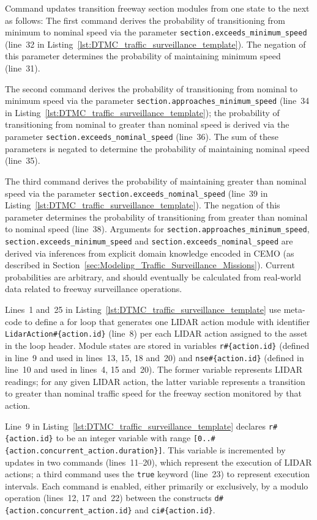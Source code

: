 Command updates transition freeway section modules from one state to the next as follows: The first command derives the probability of transitioning from minimum to nominal speed via the parameter \texttt{section.exceeds\_minimum\_speed} (line~32 in Listing~\ref{lst:DTMC_traffic_surveillance_template}). The negation of this parameter determines the probability of maintaining minimum speed (line~31).

The second command derives the probability of transitioning from nominal to minimum speed via the parameter \texttt{section.approaches\_minimum\_speed} (line~34 in Listing~\ref{lst:DTMC_traffic_surveillance_template}); the probability of transitioning from nominal to greater than nominal speed is derived via the parameter \texttt{section.exceeds\_nominal\_speed} (line~36). The sum of these parameters is negated to determine the probability of maintaining nominal speed (line~35).

The third command derives the probability of maintaining greater than nominal speed via the parameter \texttt{section.exceeds\_nominal\_speed} (line~39 in Listing~\ref{lst:DTMC_traffic_surveillance_template}). The negation of this parameter determines the probability of transitioning from greater than nominal to nominal speed (line~38). Arguments for \texttt{section.approaches\_minimum\_speed}, \texttt{section.exceeds\_minimum\_speed} and \texttt{section.exceeds\_nominal\_speed} are derived via inferences from explicit domain knowledge encoded in CEMO (as described in Section~\ref{sec:Modeling_Traffic_Surveillance_Missions}). Current probabilities are arbitrary, and should eventually be calculated from real-world data related to freeway surveillance operations.

Lines~1 and~25 in Listing~\ref{lst:DTMC_traffic_surveillance_template} use meta-code to define a for loop that generates one LIDAR action module with identifier \texttt{LidarAction\#\{action.id\}} (line~8) per each LIDAR action assigned to the asset in the loop header. Module states are stored in variables \texttt{r\#\{action.id\}} (defined in line~9 and used in lines~13, 15, 18 and~20) and \texttt{nse\#\{action.id\}} (defined in line~10 and used in lines~4, 15 and~20). The former variable represents LIDAR readings; for any given LIDAR action, the latter variable represents a transition to greater than nominal traffic speed for the freeway section monitored by that action.

Line~9 in Listing~\ref{lst:DTMC_traffic_surveillance_template} declares \texttt{r\#\{action.id\}} to be an integer variable with range \texttt{[0..\#\{action.concurrent\_action.duration\}]}. This variable is incremented by updates in two commands (lines~11--20), which represent the execution of LIDAR actions; a third command uses the \texttt{true} keyword (line~23) to represent execution intervals. Each command is enabled, either primarily or exclusively, by a modulo operation (lines~12, 17 and~22) between the constructs \texttt{d\#\{action.concurrent\_action.id\}} and \texttt{ci\#\{action.id\}}.

